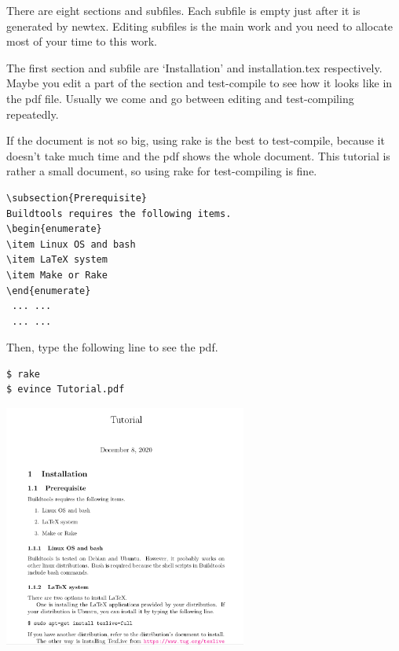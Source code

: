 There are eight sections and subfiles.
Each subfile is empty just after it is generated by newtex.
Editing subfiles is the main work and you need to allocate most of your time to this work.

The first section and subfile are `Installation' and installation.tex respectively.
Maybe you edit a part of the section and test-compile to see how it looks like in the pdf file.
Usually we come and go between editing and test-compiling repeatedly.

If the document is not so big, using rake is the best to test-compile, because it doesn't take much time and the pdf shows the whole document.
This tutorial is rather a small document, so using rake for test-compiling is fine.

\begin{verbatim}
\subsection{Prerequisite}
Buildtools requires the following items.
\begin{enumerate}
\item Linux OS and bash
\item LaTeX system
\item Make or Rake
\end{enumerate}
 ... ...
 ... ...
\end{verbatim}

Then, type the following line to see the pdf.
\begin{verbatim}
$ rake
$ evince Tutorial.pdf
\end{verbatim}

\begin{center}
\includegraphics[width=8cm]{Tutorial_2.png}
\end{center}
